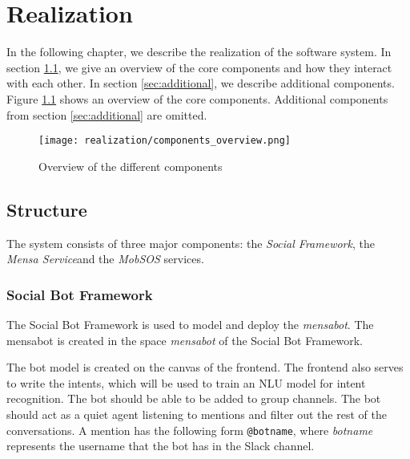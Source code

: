 
\chapter{Realization}
In the following chapter, we describe the realization of the software system. In section \ref{sec:structure}, we give an overview of the core components and how they interact with each other. 
In section \ref{sec:additional}, we describe additional components. Figure \ref{fig:componentsOverview} shows an overview of the core components. Additional components from section \ref{sec:additional} are omitted.


\begin{figure}[h]
    \centering
    \texttt{[image: realization/components\_overview.png]}
    \caption{Overview of the different components}
    \label{fig:componentsOverview}
\end{figure}

\section{Structure}\label{sec:structure}
The system consists of three major components: the \emph{Social Framework}, the \emph{Mensa Service}\footnotemark and the \emph{MobSOS} services. 
\subsection{Social Bot Framework}
The Social Bot Framework is used to model and deploy the \emph{mensabot}. The mensabot is created in the space \emph{mensabot} of the Social Bot Framework.

The bot model is created on the canvas of the frontend. 
The frontend also serves to write the intents, which will be used to train an NLU model for intent recognition. 
The bot should be able to be added to group channels. The bot should act as a quiet agent listening to mentions and filter out the rest of the conversations.
A mention has the following form \texttt{@botname}, where \emph{botname} represents the username that the bot has in the Slack channel.


